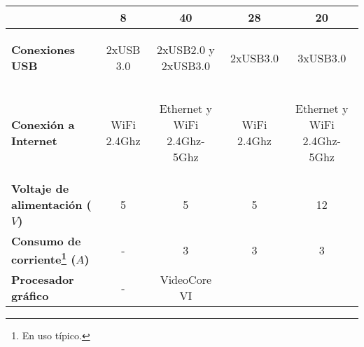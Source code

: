 \begin{savenotes}
\begin{mytable}[H]
\begin{tabular}{l|c|c|c|c|}
{\begin{minipage}{\myforthmaxsizeofcontenttable}
				\end{minipage}
			} & 8 & 40 & 28 & 20 \\ \hline		
			\multicolumn{1}{|l|}{
				\begin{minipage}{\myforthmaxsizeofcontenttable}	
					\textbf{Conexiones USB}
				\end{minipage}
			} & 2xUSB 3.0 & 
			\begin{minipage}{\mythirdmaxsizeofcontenttable}\begin{myflushcenterinsidetable}
					2xUSB2.0 y 2xUSB3.0
			\end{myflushcenterinsidetable}\end{minipage}
			& 2xUSB3.0 & 3xUSB3.0 \\ \hline	
			\multicolumn{1}{|l|}{
				\begin{minipage}{\myforthmaxsizeofcontenttable}	
					\textbf{Conexión a Internet}
				\end{minipage}
			} & WiFi 2.4Ghz & 
			\begin{minipage}{\mythirdmaxsizeofcontenttable}\begin{myflushcenterinsidetable}
					Ethernet y WiFi 2.4Ghz- 5Ghz
			\end{myflushcenterinsidetable}\end{minipage}
			& WiFi 2.4Ghz & 
			\begin{minipage}{\mythirdmaxsizeofcontenttable}\begin{myflushcenterinsidetable}
					Ethernet y WiFi 2.4Ghz- 5Ghz
			\end{myflushcenterinsidetable}\end{minipage} \\ \hline		
			\multicolumn{1}{|l|}{
				\begin{minipage}{\myforthmaxsizeofcontenttable}	
					\textbf{Voltaje de alimentación ($V$)}
				\end{minipage}
			} & 5 & 5 & 5 & 12 \\ \hline			
			\multicolumn{1}{|l|}{
				\begin{minipage}{\myforthmaxsizeofcontenttable}	
					\textbf{Consumo de corriente\footnote{En uso típico.} ($A$)}
				\end{minipage}
			} & - & 3 & 3 & 3 \\ \hline
			\multicolumn{1}{|l|}{
				\begin{minipage}{\myforthmaxsizeofcontenttable}	
					\textbf{Procesador gráfico}
				\end{minipage}
			} & - & VideoCore VI & 		
			\begin{minipage}{\mythirdmaxsizeofcontenttable}\begin{myflushcenterinsidetable}

\end{myflushcenterinsidetable}
\end{minipage}
\end{tabular}
\end{mytable}
\end{savenotes}
